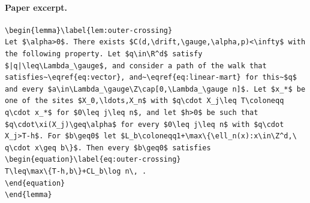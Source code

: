 \paragraph{Paper excerpt.}
\begin{verbatim}
\begin{lemma}\label{lem:outer-crossing}
Let $\alpha>0$. There exists $C(d,\drift,\gauge,\alpha,p)<\infty$ with the following property. Let $q\in\R^d$ satisfy $|q|\leq\Lambda_\gauge$, and consider a path of the walk that satisfies~\eqref{eq:vector}, and~\eqref{eq:linear-mart} for this~$q$ and every $a\in\Lambda_\gauge\Z\cap[0,\Lambda_\gauge n]$. Let $x_*$ be one of the sites $X_0,\ldots,X_n$ with $q\cdot X_j\leq T\coloneqq q\cdot x_*$ for $0\leq j\leq n$, and let $h>0$ be such that $q\cdot\xi(X_j)\geq\alpha$ for every $0\leq j\leq n$ with $q\cdot X_j>T-h$. For $b\geq0$ let $L_b\coloneqq1+\max\{\ell_n(x):x\in\Z^d,\ q\cdot x\geq b\}$. Then every $b\geq0$ satisfies
\begin{equation}\label{eq:outer-crossing}
T\leq\max\{T-h,b\}+CL_b\log n\, .
\end{equation}
\end{lemma}
\end{verbatim}

